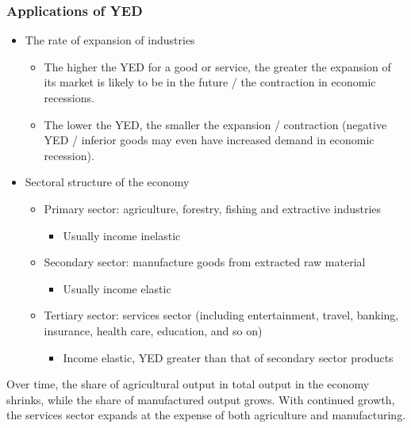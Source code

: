 \documentclass[a4paper,12pt]{article}
\begin{document}
\subsubsection*{Applications of YED}
\begin{itemize}
  \item The rate of expansion of industries
  \begin{itemize}
    \item The higher the YED for a good or service, the greater the expansion of its market is likely to be in the future / the contraction in economic recessions.
    \item The lower the YED, the smaller the expansion / contraction (negative YED / inferior goods may even have increased demand in economic recession).
  \end{itemize}
  \item Sectoral structure of the economy
  \begin{itemize}
      \item Primary sector: agriculture, forestry, fishing and extractive industries
      \begin{itemize}
        \item Usually income inelastic
      \end{itemize}
      \item Secondary sector: manufacture goods from extracted raw material
      \begin{itemize}
        \item Usually income elastic
      \end{itemize}
      \item Tertiary sector: services sector (including entertainment, travel, banking, insurance, health care, education, and so on)
      \begin{itemize}
        \item Income elastic, YED greater than that of secondary sector products
      \end{itemize}
  \end{itemize}
\end{itemize}
Over time, the share of agricultural output in total output in the economy shrinks, while the share of manufactured output grows. With continued growth, the services sector expands at the expense of both agriculture and manufacturing.
\end{document}
